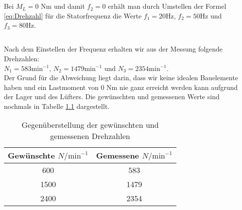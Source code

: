 \chapter{}\label{ex:aufg5}
%
\section{}\label{sec:aufg5a}
%
Bei $M_L = 0$ Nm und damit $f_2 = 0$ erhält man durch Umstellen der Formel \ref{eq:Drehzahl} für die Statorfrequenz die Werte $f_1 = 20 \text{Hz}$, $f_2 = 50 \text{Hz}$ und $f_3 = 80 \text{Hz}$.
\section{}\label{sec:aufg5b}
%
Nach dem Einstellen der Frequenz erhalten wir aus der Messung folgende Drehzahlen:\\
$N_1 = 583 \text{min}^{-1}$, $N_2 = 1479 \text{min}^{-1}$ und $N_3 = 2354 \text{min}^{-1}$.\\
Der Grund für die Abweichung liegt darin, dass wir keine idealen Bauelemente haben und ein Lastmoment von 0 Nm nie ganz erreicht werden kann aufgrund der Lager und des Lüfters. Die gewünschten und gemessenen Werte sind nochmals in Tabelle \ref{tab:drehzahlen} dargestellt.
\begin{table}[htb]
	\centering
	\begin{tabular}{c | c}
		Gewünschte $N/\text{min}^{-1}$ & Gemessene $N/\text{min}^{-1}$\\\hline
		600 &  583 \\ 
		1500 & 1479 \\ 
		2400 & 2354
	\end{tabular} 
	\caption{Gegenüberstellung der gewünschten und gemessenen Drehzahlen}
	\label{tab:drehzahlen}
\end{table}
	
	
